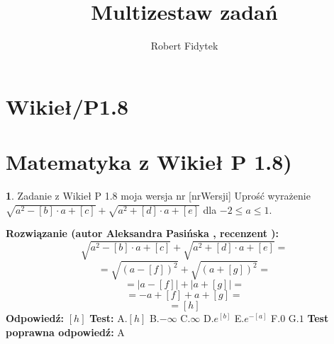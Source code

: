 \documentclass[12pt, a4paper]{article}
\title{Multizestaw zadań}
\author{Robert Fidytek}
\date{}
\theoremstyle{definition} %
\newtheorem{zad}{}
\newcommand{\kategoria}[1]{\section{#1}} %
\newcommand{\zadStart}[1]{\begin{zad}#1\newline} %
\newcommand{\zadStop}{\end{zad}}   %
\newcommand{\rozwStart}[2]{\noindent \textbf{Rozwiązanie (autor #1 , recenzent #2): }\newline} %
\newcommand{\rozwStop}{\newline}                                            %
\newcommand{\odpStart}{\noindent \textbf{Odpowiedź:}\newline}    %
\newcommand{\odpStop}{\newline}                                             %
\newcommand{\testStart}{\noindent \textbf{Test:}\newline} %
\newcommand{\testStop}{\newline} %
\newcommand{\kluczStart}{\noindent \textbf{Test poprawna odpowiedź:}\newline} %
\newcommand{\kluczStop}{\newline} %
\begin{document}
\maketitle


\kategoria{Wikieł/P1.8}
\kategoria{Matematyka z Wikieł P 1.8)}
\zadStart{Zadanie z Wikieł P 1.8 moja wersja nr [nrWersji]}
Uprość wyrażenie $\sqrt{a^2-[b]\cdot a+[c]}+\sqrt{a^2+[d]\cdot a+[e]}$ dla $-2\leq a\leq 1$.
\zadStop
\rozwStart{Aleksandra Pasińska}{}
$$\sqrt{a^2-[b]\cdot a+[c]}+\sqrt{a^2+[d]\cdot a+[e]}=$$ 
$$=\sqrt{(a-[f])^2}+\sqrt{(a+[g])^2}=$$ 
$$=|a-[f]|+|a+[g]|=$$ 
$$=-a+[f]+a+[g]=$$ 
$$=[h]$$ 
\rozwStop
\odpStart
$[h]$
\odpStop
\testStart
A.$[h]$
B.$-\infty$
C.$\infty$
D.$e^{[b]}$
E.$e^{-[a]}$
F.$0$
G.$1$
\testStop
\kluczStart
A
\kluczStop
\end{document}
